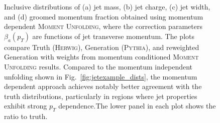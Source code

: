 \begin{figure}
    \caption[Momentum dependent unfolding of inclusive jet substructure distributions]{Inclusive distributions of (a) jet mass, (b) jet charge, (c) jet width, and (d) groomed momentum fraction obtained using momentum dependent \textsc{Moment Unfolding}, where the correction parameters $\beta_a(p_T)$ are functions of jet transverse momentum. The plots compare Truth (\textsc{Herwig}), Generation (\textsc{Pythia}), and reweighted Generation with weights from momentum conditioned \textsc{Moment Unfolding} results. Compared to the momentum independent unfolding shown in Fig.~\ref{fig:jetexample_dists}, the momentum dependent approach achieves notably better agreement with the truth distributions, particularly in regions where jet properties exhibit strong $p_T$ dependence.The lower panel in each plot shows the ratio to truth.}
    \label{fig:pjetexample}
\end{figure}
